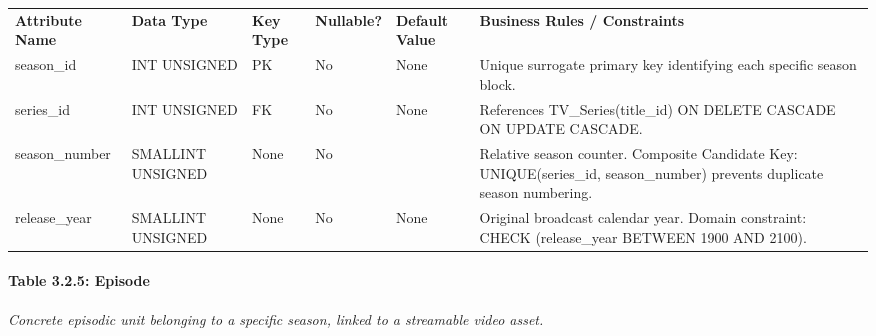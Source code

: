 {\def\LTcaptype{none} %
\begin{longtable}[]{@{}
  >{\raggedright\arraybackslash}p{}
  >{\raggedright\arraybackslash}p{}
  >{\raggedright\arraybackslash}p{}
  >{\raggedright\arraybackslash}p{}
  >{\raggedright\arraybackslash}p{}
  >{\raggedright\arraybackslash}p{}@{}}
\arrayrulecolor{black}\toprule\noalign{}
\endhead
\bottomrule\noalign{}
\endlastfoot
\textbf{Attribute Name} & \textbf{Data Type} & \textbf{Key Type} & \textbf{Nullable?} & \textbf{Default Value} & \textbf{Business Rules / Constraints} \\ \arrayrulecolor{black}\midrule
season\_\allowbreak{}id & INT UNSIGNED & PK & No & None & Unique surrogate primary key identifying each specific season block. \\ \arrayrulecolor{black!20}\midrule
series\_\allowbreak{}id & INT UNSIGNED & FK & No & None & References TV\_\allowbreak{}Series(title\_\allowbreak{}id) ON DELETE CASCADE ON UPDATE CASCADE. \\ \arrayrulecolor{black!20}\midrule
season\_\allowbreak{}number & SMALLINT UNSIGNED & None & No & 1 & Relative season counter. Composite Candidate Key: UNIQUE(series\_\allowbreak{}id, season\_\allowbreak{}number) prevents duplicate season numbering. \\ \arrayrulecolor{black!20}\midrule
release\_\allowbreak{}year & SMALLINT UNSIGNED & None & No & None & Original broadcast calendar year. Domain constraint: CHECK (release\_\allowbreak{}year BETWEEN 1900 AND 2100). \\
\end{longtable}
}

\paragraph{\texorpdfstring{\textbf{Table 3.2.5: Episode}}{Table 3.2.5: Episode}}\label{table-3.2.5-episode}

\emph{Concrete episodic unit belonging to a specific season, linked to a streamable video asset.}

